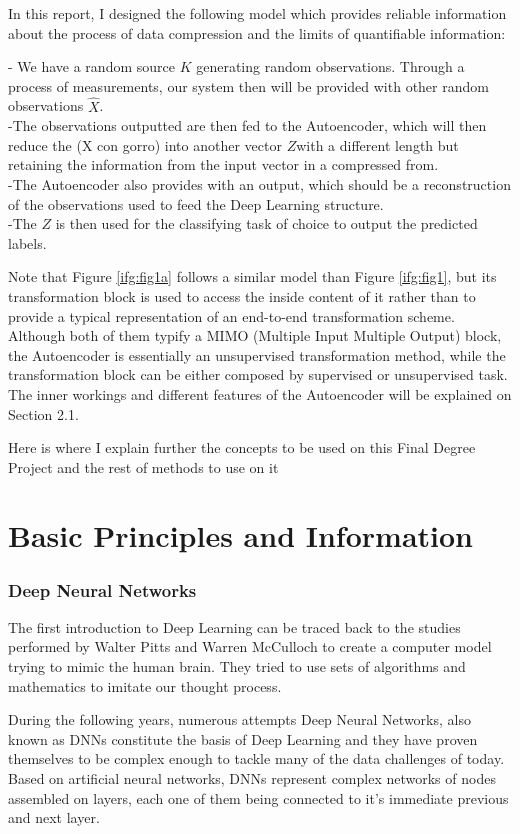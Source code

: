 \documentclass[12pt]{report}
\begin{document}
In this report, I designed the following model which provides reliable information about the process of data compression and the limits of quantifiable information: \par

- We have a random source $K$ generating random observations. Through a process of measurements, our system then will be provided with other random observations $\hat{X}$. \\
-The observations outputted are then fed to the Autoencoder, which will then reduce the (X con gorro) into another vector $Z$with a different length but retaining the information from the input vector in a compressed from. \\
-The Autoencoder also provides with an output, which should be a reconstruction of the observations used to feed the Deep Learning structure. \\
-The $Z$ is then used for the classifying task of choice to output the predicted labels. \par

Note that Figure \ref{ifg:fig1a} follows a similar model than Figure \ref{ifg:fig1}, but its transformation block is used to access the inside content of it rather than to provide a typical representation of an end-to-end transformation scheme. Although both of them typify a MIMO (Multiple Input Multiple Output) block, the Autoencoder is essentially an unsupervised transformation method, while the transformation block can be either composed by supervised or unsupervised task. The inner workings and different features of the Autoencoder will be explained on Section 2.1. \par

Here is where I explain further the concepts to be used on this Final Degree Project and the rest of methods to use on it \par
\chapter{Basic Principles and Information}

\subsection{Deep Neural Networks}

The first introduction to Deep Learning can be traced back to the studies performed by Walter Pitts and Warren McCulloch to create a computer model trying to mimic the human brain. They tried to use sets of algorithms and mathematics to imitate our thought process.\par
During the following years, numerous attempts 
Deep Neural Networks, also known as DNNs constitute the basis of Deep Learning and they have proven themselves to be complex enough to tackle many of the data challenges of today. Based on artificial neural networks, DNNs represent complex networks of nodes assembled on layers, each one of them being connected to it's immediate previous and next layer.   \par
\end{document}
